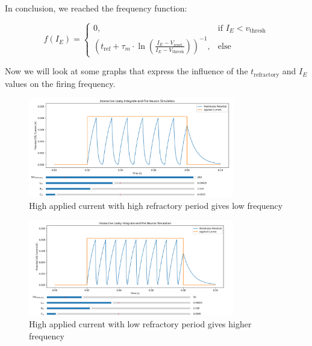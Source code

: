 In conclusion, we reached the frequency function:

\begin{equation}
f(I_E) = \begin{cases}
    0, & \text{if } I_E < v_{\text{thresh}} \\
    \left(t_{\text{ref}} + \tau_m \cdot \ln\left(\frac{I_E - V_{\text{reset}}}{I_E - V_{\text{thresh}}}\right)\right)^{-1}, & \text{else}
\end{cases}
\end{equation}

Now we will look at some graphs that express the influence of the \( t_{\text{refractory}} \) and \( I_E \) values on the firing frequency.

\begin{figure}[H]
    \centering
    \includegraphics[width=0.8\textwidth]{methods/computational-models/graphs/LIF-heaviside-high-ref.png}
    \caption{High applied current with high refractory period gives low frequency}
    \label{fig:LIF-heaviside-high-ref}
\end{figure}

\begin{figure}[H]
    \centering
    \includegraphics[width=0.8\textwidth]{methods/computational-models/graphs/LIF-heaviside-low-ref.png}
    \caption{High applied current with low refractory period gives higher frequency}
    \label{fig:LIF-heaviside-low-ref}
\end{figure}

